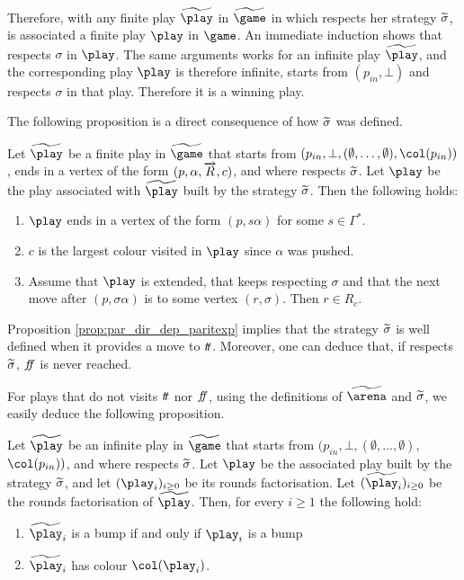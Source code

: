 Therefore, with any finite play $\fplay$ in $\fgame$ in which \Eve
respects her strategy $\widetilde{\sigma}$, is associated a finite play $\play$ in
$\game$. An immediate induction shows that \Eve respects $\sigma$ in
$\play$. The same arguments works for an infinite play $\fplay$, and the
corresponding play $\play$ is therefore infinite, starts from
$(p_{in},\bot)$ and \Eve respects $\sigma$ in that play. Therefore it is
a winning play.

The following proposition is a direct consequence of how $\widetilde{\sigma}$ was defined.

\begin{proposition}\label{prop:par_dir_dep_paritexp}
Let $\fplay$ be a finite play in $\fgame$ that starts from
$(p_{in},\bot,(\emptyset,\dots,\emptyset),\pdscol{p_{in}})$,
ends in a vertex of the form $(p,\alpha,\overrightarrow{R},c)$,
and where \Eve respects $\widetilde{\sigma}$. Let $\play$ be the play associated with $\fplay$
built by the strategy $\widetilde{\sigma}$. Then the following holds:
\begin{enumerate}
\item $\play$ ends in a vertex of the form $(p,s\alpha)$ for some $s\in\Gamma^*$.

\item $c$ is the largest colour visited in $\play$ since $\alpha$ was pushed.

\item Assume that $\play$ is extended, that \Eve keeps respecting
  $\sigma$ and that the next move after $(p,\sigma\alpha)$ is to some
  vertex $(r,\sigma)$. Then $r\in R_c$.
\end{enumerate}
\end{proposition}


Proposition \ref{prop:par_dir_dep_paritexp} implies that the
strategy $\widetilde{\sigma}$ is well defined when it provides a move to
$t\! t$. Moreover, one can deduce that, if \Eve respects $\widetilde{\sigma}$, $f\!\! f$ is never reached.

For plays that do not visits $t\! t$ nor $f\!\! f$, using the definitions of $\farena$ and $\widetilde{\sigma}$, we easily deduce the
following proposition.


\begin{proposition}\label{prop:toto}
Let $\fplay$ be an infinite play in $\fgame$ that starts from
$(p_{in},\bot,(\emptyset,\dots,\emptyset),$ $\pdscol{p_{in}})$,
and where \Eve respects $\widetilde{\sigma}$. Let $\play$ be the associated
play built by the strategy $\widetilde{\sigma}$, and let $(\play_i)_{i\geq 0}$ be its rounds factorisation. Let $(\fplay_i)_{i\geq 0}$ be
the rounds factorisation of $\fplay$. Then, for every $i\geq 1$ the
following hold:
\begin{enumerate}
\item $\fplay_i$ is a bump if and only if $\play_i$ is a bump

\item $\fplay_i$ has colour $\pdscol{\play_i}$.
\end{enumerate}
\end{proposition}


